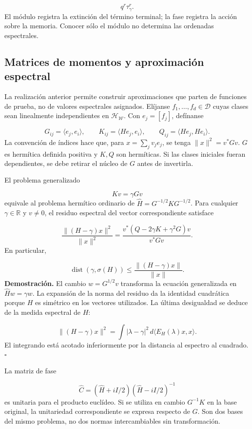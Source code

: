 \[
q^r\tau_\gamma^r.
\]
El módulo registra la extinción del término terminal; la fase registra la acción sobre la memoria. Conocer sólo el módulo no determina las ordenadas espectrales.

\subsection{Matrices de momentos y aproximación espectral}
\label{rz:galerkin}
La realización anterior permite construir aproximaciones que parten de funciones de prueba, no de valores espectrales asignados. Elíjanse \(f_1,\ldots,f_d\in\mathcal D\) cuyas clases sean linealmente independientes en \(\mathcal H_{\mathscr W}\). Con \(e_j=[f_j]\), defínanse

\[
G_{ij}=\langle e_j,e_i\rangle,\qquad
K_{ij}=\langle He_j,e_i\rangle,\qquad
Q_{ij}=\langle He_j,He_i\rangle.
\]
La convención de índices hace que, para \(x=\sum_jv_je_j\), se tenga \(\|x\|^2=v^*Gv\). \(G\) es hermítica definida positiva y \(K,Q\) son hermíticas. Si las clases iniciales fueran dependientes, se debe retirar el núcleo de \(G\) antes de invertirla.

El problema generalizado

\[
Kv=\gamma Gv
\]
equivale al problema hermítico ordinario de \(\widehat H=G^{-1/2}KG^{-1/2}\). Para cualquier \(\gamma\in\mathbb R\) y \(v\neq0\), el residuo espectral del vector correspondiente satisface

\[
\frac{\|(H-\gamma)x\|^2}{\|x\|^2}
=\frac{v^*(Q-2\gamma K+\gamma^2G)v}{v^*Gv}.
\]
En particular,

\[
\operatorname{dist}(\gamma,\sigma(H))
\leq\frac{\|(H-\gamma)x\|}{\|x\|}.
\]
\textbf{Demostración.} El cambio \(w=G^{1/2}v\) transforma la ecuación generalizada en \(\widehat Hw=\gamma w\). La expansión de la norma del residuo da la identidad cuadrática porque \(H\) es simétrico en los vectores utilizados. La última desigualdad se deduce de la medida espectral de \(H\):

\[
\|(H-\gamma)x\|^2
=\int |\lambda-\gamma|^2\,d\langle E_H(\lambda)x,x\rangle.
\]
El integrando está acotado inferiormente por la distancia al espectro al cuadrado. \hfill\(\square\)

La matriz de fase

\[
\widehat C=(\widehat H+iI/2)(\widehat H-iI/2)^{-1}
\]
es unitaria para el producto euclídeo. Si se utiliza en cambio \(G^{-1}K\) en la base original, la unitariedad correspondiente se expresa respecto de \(G\). Son dos bases del mismo problema, no dos normas intercambiables sin transformación.


